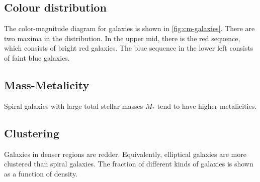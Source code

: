 \subsection{Colour distribution}
The color-magnitude diagram for galaxies is shown in \cref{fig:cm-galaxies}.
There are two maxima in the distribution.
In the upper mid, there is the red sequence, which consists of bright red galaxies.
The blue sequence in the lower left consists of faint blue galaxies.

\subsection{Mass-Metalicity}
Spiral galaxies with large total stellar masses $M_*$ tend to have higher metalicities.

\subsection{Clustering}
Galaxies in denser regions are redder.
Equivalently, elliptical galaxies are more clustered than spiral galaxies.
The fraction of different kinds of galaxies is shown as a function of density.













